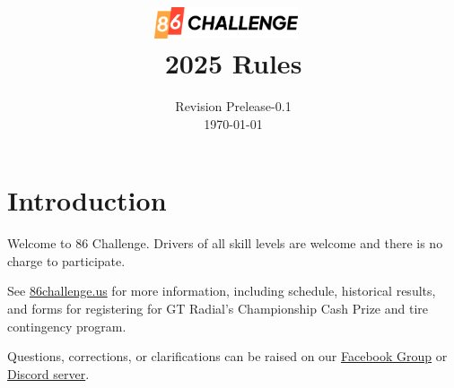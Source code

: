 \documentclass{article}
\newenvironment{prose}{
  \setlength{\parskip}{6pt}
}{
  \setlength{\parskip}{0pt}
}
\begin{document}
\title{
	\includegraphics[width=120pt]{images/logo.png}~\\[12pt]
2025 Rules}
    \author{
        \small{Revision Prelease-0.1}\\
        \small{\today}
    }
    \date{}
    \maketitle

    \tableofcontents
	
    \section*{Introduction}
				
		\begin{prose}
			Welcome to 86 Challenge. Drivers of all skill levels are welcome and there is no charge to participate. 
						
			See \href{http://86challenge.us}{86challenge.us} for more information, including schedule, historical results, and forms for registering for GT Radial's Championship Cash Prize and tire contingency program.
						    
			Questions, corrections, or clarifications can be raised on our \href{https://www.facebook.com/groups/1009986312348877}{Facebook Group} or \href{https://discord.gg/sDKdV4TS4T}{Discord server}.
		\end{prose}
				
\end{document}
